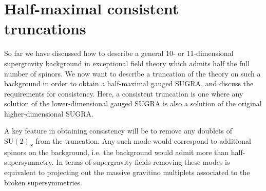 \documentclass{PoS}
\newcommand{\SU}[1]{\mathrm{SU}( #1 )}
\begin{document}
\section{Half-maximal consistent truncations}\label{s:ConsTruncation}
So far we have discussed how to describe a general 10- or 11-dimensional supergravity background in exceptional field theory which admits half the full number of spinors. We now want to describe a truncation of the theory on such a background in order to obtain a half-maximal gauged SUGRA, and discuss the requirements for consistency. Here, a consistent truncation is one where any solution of the lower-dimensional gauged SUGRA is also a solution of the original higher-dimensional SUGRA.

A key feature in obtaining consistency will be to remove any doublets of $\SU{2}_S$ from the truncation. Any such mode would correspond to additional spinors on the background, i.e. the background would admit more than half-supersymmetry. In terms of supergravity fields removing these modes is equivalent to projecting out the massive gravitino multiplets associated to the broken supersymmetries.
\end{document}
